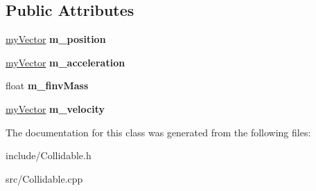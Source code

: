 \subsection*{Public Attributes}
\begin{DoxyCompactItemize}
\item 
\hypertarget{class_collidable_abb12d204a079d68951d396005270c70b}{}\hyperlink{classmy_vector}{my\+Vector} {\bfseries m\+\_\+position}\label{class_collidable_abb12d204a079d68951d396005270c70b}

\item 
\hypertarget{class_collidable_aacad0202ea0d4f51a6875bce682ff3eb}{}\hyperlink{classmy_vector}{my\+Vector} {\bfseries m\+\_\+acceleration}\label{class_collidable_aacad0202ea0d4f51a6875bce682ff3eb}

\item 
\hypertarget{class_collidable_a729958861685b10ff9718a24fca09c8e}{}float {\bfseries m\+\_\+finv\+Mass}\label{class_collidable_a729958861685b10ff9718a24fca09c8e}

\item 
\hypertarget{class_collidable_adfeaec03dc9c1c5791b7bc94cff04c44}{}\hyperlink{classmy_vector}{my\+Vector} {\bfseries m\+\_\+velocity}\label{class_collidable_adfeaec03dc9c1c5791b7bc94cff04c44}

\end{DoxyCompactItemize}


The documentation for this class was generated from the following files\+:\begin{DoxyCompactItemize}
\item 
include/Collidable.\+h\item 
src/Collidable.\+cpp\end{DoxyCompactItemize}
